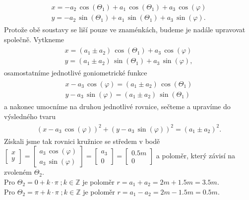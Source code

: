 \documentclass{article}
\begin{document}
				\begin{align}
					\begin{array}{c}
						x = -a_2 \,\cos \left(\Theta_1\right)+a_1 \,\cos \left(\Theta_1 \right)+a_3\,\cos\left(\varphi \right)\\
						y = -a_2 \,\sin \left(\Theta_1\right)+a_1 \,\sin \left(\Theta_1 \right)+a_3\,\sin\left(\varphi \right).
					\end{array}
				\end{align}
			Protože obě soustavy se liší pouze ve znaménkách, budeme je nadále upravovat společně. Vytkneme
				\begin{align}
					\begin{array}{c}
						x = (a_1 \pm a_2) \,\cos \left(\Theta_1\right)+a_3 \,\cos\left(\varphi \right)\\
						y = (a_1\pm a_2) \,\sin \left(\Theta_1\right)+a_3 \,\sin\left(\varphi \right),
					\end{array}
				\end{align}
			osamostatníme jednotlivé goniometrické funkce
				\begin{align}
					\begin{array}{c}
						x -a_3 \,\cos\left(\varphi \right) = (a_1 \pm a_2) \,\cos \left(\Theta_1\right)\\
						y -a_3 \,\sin\left(\varphi \right)= (a_1\pm a_2) \,\sin \left(\Theta_1\right)
					\end{array}
				\end{align}
			a nakonec umocníme na druhou jednotlivé rovnice, sečteme a upravíme do výsledného tvaru
				\begin{align}
					\begin{array}{c}
						\left(x -a_3 \,\cos\left(\varphi \right)\right)^2 +\left(y -a_3 \,\sin\left(\varphi\right)\right)^2 = (a_1 \pm a_2)^2.
						\label{eq:rce_kruznice}
					\end{array}
				\end{align}
			Získali jsme tak rovnici kružnice se středem v bodě \(\begin{bmatrix}x\\y\end{bmatrix} = \begin{bmatrix}a_3 \,\cos\left(\varphi \right)\\a_3 \,\sin\left(\varphi \right)\end{bmatrix} = \begin{bmatrix}a_3\\0\end{bmatrix} = \begin{bmatrix}0.5 m\\0\end{bmatrix}\) a poloměr, který závisí na zvoleném \(\Theta_{2}\).\\
			\noindent
			Pro \(\Theta_{2}=0+k\cdot\pi \; ;k\in \mathbb{Z}\) je poloměr \(r = a_1 + a_2 = 2m + 1.5m = 3.5m\).\\
			\noindent
			Pro \(\Theta_{2}=\pi+k\cdot\pi \; ;k\in \mathbb{Z}\) je poloměr \(r = a_1 - a_2 = 2m - 1.5m = 0.5m\).\\
			
\end{document}
